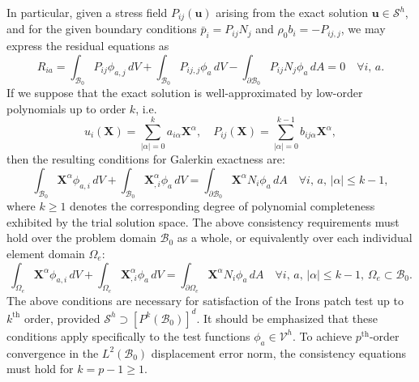 In particular, given a stress field $P_{ij} (\mathbf{u})$ arising from the exact solution $\mathbf{u} \in \mathcal{S}^h$, and for the given boundary conditions $\bar{p}_i = P_{ij} N_j$ and $\rho_0 b_i = - P_{ij,j}$, we may express the residual equations as
\begin{equation}
	R_{ia} = \int_{\mathcal{B}_0} P_{ij} \phi_{a,j} \, dV + \int_{\mathcal{B}_0} P_{ij,j} \phi_a \, dV - \int_{\partial \mathcal{B}_0} P_{ij} N_j \phi_a \, dA = 0 \quad \forall i, \, a.
\end{equation}
If we suppose that the exact solution is well-approximated by low-order polynomials up to order $k$, i.e.
\begin{equation}
  u_{i} (\mathbf{X}) = \sum_{|\alpha| = 0}^{k} a_{i\alpha} \mathbf{X}^\alpha, \quad P_{ij} (\mathbf{X}) = \sum_{|\alpha| = 0}^{k-1} b_{ij\alpha} \mathbf{X}^\alpha,
\end{equation}
then the resulting conditions for Galerkin exactness are:
\begin{equation}
  \int_{\mathcal{B}_0} \mathbf{X}^{\alpha} \phi_{a,i} \, dV + \int_{\mathcal{B}_0} \mathbf{X}^{\alpha}_{,i} \phi_a \, dV = \int_{\partial \mathcal{B}_0} \mathbf{X}^{\alpha} N_i \phi_a \, dA \quad \forall i, \, a, \, | \alpha | \leq k-1,
\end{equation}
where $k \geq 1$ denotes the corresponding degree of polynomial completeness exhibited by the trial solution space. The above consistency requirements must hold over the problem domain $\mathcal{B}_0$ as a whole, or equivalently over each individual element domain $\Omega_e$:
\begin{equation}
  \int_{\Omega_e} \mathbf{X}^{\alpha} \phi_{a,i} \, dV + \int_{\Omega_e} \mathbf{X}^{\alpha}_{,i} \phi_a \, dV = \int_{\partial \Omega_e} \mathbf{X}^{\alpha} N_i \phi_a \, dA \quad \forall i, \, a, \, | \alpha | \leq k-1, \, \Omega_e \subset \mathcal{B}_0.
  \label{eq:consistency}
\end{equation}
The above conditions are necessary for satisfaction of the Irons patch test up to $k^{\text{th}}$ order, provided $\mathcal{S}^h \supset [ P^{k} (\mathcal{B}_0) ]^d$. It should be emphasized that these conditions apply specifically to the test functions $\phi_a \in \mathcal{V}^h$. To achieve $p^{\text{th}}$-order convergence in the $L^2 (\mathcal{B}_0)$ displacement error norm, the consistency equations must hold for $k = p-1 \geq 1$.

